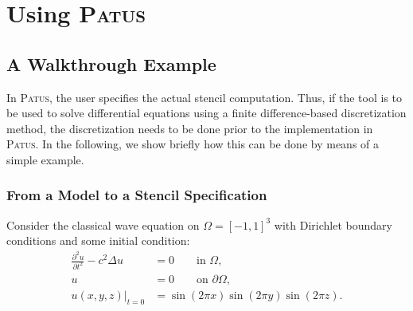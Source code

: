 \section{Using \textsc{Patus}}

\subsection{A Walkthrough Example}
\label{sec:wave}

In \textsc{Patus}, the user specifies the actual stencil computation.
Thus, if the tool is to be used to solve differential equations using a finite difference-based
discretization method, the discretization needs to be done prior to the implementation in \textsc{Patus}.
In the following, we show briefly how this can be done by means of a simple example.


\subsubsection{From a Model to a Stencil Specification}

Consider the classical wave equation on $\Omega=[-1,1]^3$ with Dirichlet boundary conditions and some initial condition:
\begin{align}
  \frac{\partial^2 u}{\partial t^2} - c^2 \Delta u & = 0 \qquad \text{in }\Omega, \nonumber \\
  u & = 0 \qquad \text{on }\partial\Omega, \\
  u(x,y,z)|_{t=0} & = \sin(2\pi x) \sin(2\pi y) \sin (2\pi z). \nonumber
  \label{eq:wave}
\end{align}

